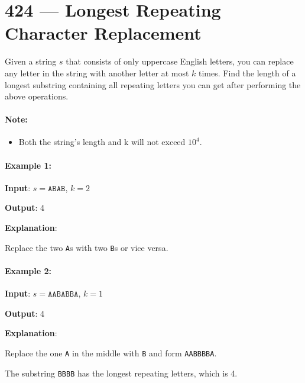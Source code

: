 \section{424 --- Longest Repeating Character Replacement}
Given a string $s$ that consists of only uppercase English letters, you can replace any letter in the string with another letter at most $ k $ times. Find the length of a longest substring containing all repeating letters you can get after performing the above operations.

\paragraph{Note:}
\begin{itemize}
\item Both the string's length and k will not exceed $10^4$.
\end{itemize}

\paragraph{Example 1:}

\begin{flushleft}
\textbf{Input}: $s = \texttt{ABAB}$, $k = 2$

\textbf{Output}: 4

\textbf{Explanation}: 

Replace the two \texttt{A}s with two \texttt{B}s or vice versa.
\end{flushleft}

\paragraph{Example 2:}

\begin{flushleft}
\textbf{Input}: $s = \texttt{AABABBA}$, $k = 1$

\textbf{Output}: 4

\textbf{Explanation}:

Replace the one \texttt{A} in the middle with \texttt{B} and form \texttt{AABBBBA}.

The substring \texttt{BBBB} has the longest repeating letters, which is 4.
\end{flushleft}

